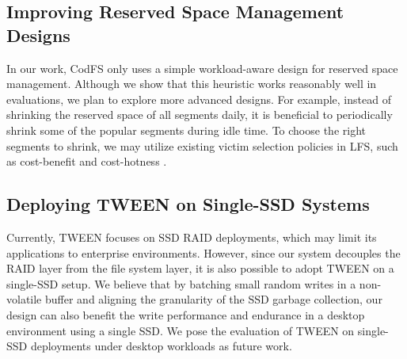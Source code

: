 \subsection{Improving Reserved Space Management Designs}

In our work, CodFS only uses a simple workload-aware design for reserved space
management. Although we show that this heuristic works reasonably well in
evaluations, we plan to explore more advanced designs. For example, instead of
shrinking the reserved space of all segments daily, it is beneficial to
periodically shrink some of the popular segments during idle time. To choose the
right segments to shrink, we may
utilize existing victim selection policies in LFS, such as cost-benefit
\cite{rosenblum92} and cost-hotness \cite{min12}.

\subsection{Deploying TWEEN on Single-SSD Systems}

Currently, TWEEN focuses on SSD RAID deployments, which may limit its
applications to enterprise environments.  However, since our system decouples
the RAID layer from the file system layer, it is also possible to adopt TWEEN on
a single-SSD setup. We believe that by batching small random writes in a
non-volatile buffer and aligning the granularity of the SSD garbage collection,
our design can also benefit the write performance and endurance in a desktop
environment using a single SSD.  We pose the evaluation of TWEEN on single-SSD
deployments under desktop workloads as future work.
